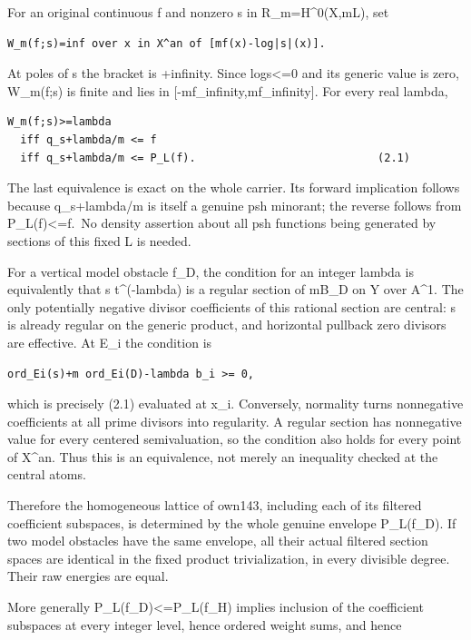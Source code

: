 \documentclass[
  10pt,
]{article}
\begin{document}
For an original continuous f and nonzero s in R\_m=H\^{}0(X,mL), set

\begin{verbatim}
W_m(f;s)=inf over x in X^an of [mf(x)-log|s|(x)].
\end{verbatim}

At poles of s the bracket is +infinity. Since
log\textbar s\textbar\textless=0 and its generic value is zero,
W\_m(f;s) is finite and lies in
{[}-m\textbar\textbar f\textbar\textbar\_infinity,m\textbar\textbar f\textbar\textbar\_infinity{]}.
For every real lambda,

\begin{verbatim}
W_m(f;s)>=lambda
  iff q_s+lambda/m <= f
  iff q_s+lambda/m <= P_L(f).                            (2.1)
\end{verbatim}

The last equivalence is exact on the whole carrier. Its forward
implication follows because q\_s+lambda/m is itself a genuine psh
minorant; the reverse follows from P\_L(f)\textless=f.~No density
assertion about all psh functions being generated by sections of this
fixed L is needed.

For a vertical model obstacle f\_D, the condition for an integer lambda
is equivalently that s t\^{}(-lambda) is a regular section of mB\_D on Y
over A\^{}1. The only potentially negative divisor coefficients of this
rational section are central: s is already regular on the generic
product, and horizontal pullback zero divisors are effective. At E\_i
the condition is

\begin{verbatim}
ord_Ei(s)+m ord_Ei(D)-lambda b_i >= 0,
\end{verbatim}

which is precisely (2.1) evaluated at x\_i. Conversely, normality turns
nonnegative coefficients at all prime divisors into regularity. A
regular section has nonnegative value for every centered semivaluation,
so the condition also holds for every point of X\^{}an. Thus this is an
equivalence, not merely an inequality checked at the central atoms.

Therefore the homogeneous lattice of own143, including each of its
filtered coefficient subspaces, is determined by the whole genuine
envelope P\_L(f\_D). If two model obstacles have the same envelope, all
their actual filtered section spaces are identical in the fixed product
trivialization, in every divisible degree. Their raw energies are equal.

More generally P\_L(f\_D)\textless=P\_L(f\_H) implies inclusion of the
coefficient subspaces at every integer level, hence ordered weight sums,
and hence
\end{document}
